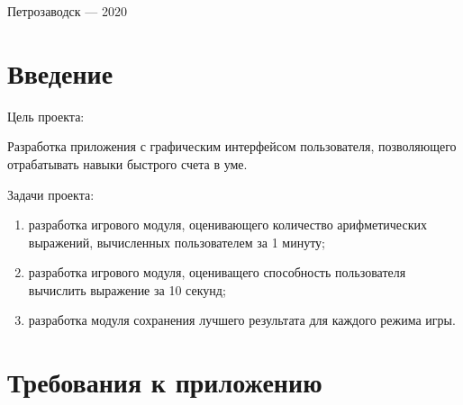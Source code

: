 \documentclass[a4paper,12pt]{article}
\begin{document}
\vfill

\begin{center}
\large
    Петрозаводск --- 2020
\end{center}



\newpage

\tableofcontents





\newpage
\section*{Введение}

Цель проекта:

Разработка приложения с графическим интерфейсом пользователя, позволяющего
отрабатывать навыки быстрого счета в уме.

Задачи проекта: 
\begin{enumerate} 
\item	разработка игрового модуля, оценивающего количество арифметических выражений,
	вычисленных пользователем за 1 минуту;
\item	разработка игрового модуля, оцениващего способность пользователя вычислить
	выражение за 10 секунд;
\item	разработка модуля сохранения лучшего результата для каждого режима игры.
\end{enumerate}




\newpage
\section{Требования к приложению}
\end{document}
